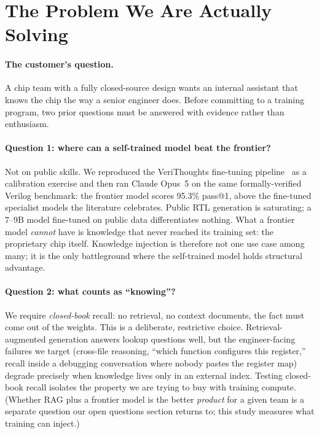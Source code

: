 \section{The Problem We Are Actually Solving}
\label{sec:problem}

\paragraph{The customer's question.}
A chip team with a fully closed-source design wants an internal assistant that
knows the chip the way a senior engineer does. Before committing to a training
program, two prior questions must be answered with evidence rather than
enthusiasm.

\paragraph{Question 1: where can a self-trained model beat the frontier?}
Not on public skills. We reproduced the VeriThoughts fine-tuning
pipeline~\citep{yubeaton2025verithoughts} as a calibration exercise and then
ran Claude Opus~5 on the same formally-verified Verilog benchmark: the frontier
model scores 95.3\% pass@1, above the fine-tuned specialist models the
literature celebrates. Public RTL generation is saturating; a 7--9B model
fine-tuned on public data differentiates nothing. What a frontier model
\emph{cannot} have is knowledge that never reached its training set: the
proprietary chip itself. Knowledge injection is therefore not one use case
among many; it is the only battleground where the self-trained model holds
structural advantage.

\paragraph{Question 2: what counts as ``knowing''?}
We require \emph{closed-book} recall: no retrieval, no context documents, the
fact must come out of the weights. This is a deliberate, restrictive choice.
Retrieval-augmented generation answers lookup questions well, but the
engineer-facing failures we target (cross-file reasoning, ``which function
configures this register,'' recall inside a debugging conversation where
nobody pastes the register map) degrade precisely when knowledge lives only
in an external index. Testing closed-book recall isolates the property we are
trying to buy with training compute. (Whether RAG plus a frontier model is the
better \emph{product} for a given team is a separate question our open
questions section returns to; this study measures what training can inject.)

